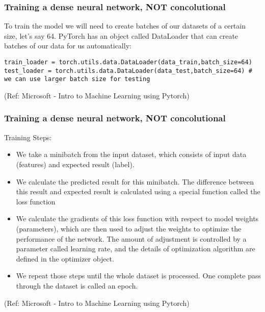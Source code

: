 \begin{frame}[fragile] \frametitle{Training a dense neural network, NOT concolutional}


To train the model we will need to create batches of our datasets of a certain size, let's say 64. PyTorch has an object called DataLoader that can create batches of our data for us automatically:

\begin{lstlisting}
train_loader = torch.utils.data.DataLoader(data_train,batch_size=64)
test_loader = torch.utils.data.DataLoader(data_test,batch_size=64) # we can use larger batch size for testing
\end{lstlisting}



\tiny{(Ref: Microsoft - Intro to Machine Learning using Pytorch)}
\end{frame}

\begin{frame}[fragile] \frametitle{Training a dense neural network, NOT concolutional}

Training Steps:

\begin{itemize}
\item We take a minibatch from the input dataset, which consists of input data (features) and expected result (label).
\item We calculate the predicted result for this minibatch.
The difference between this result and expected result is calculated using a special function called the loss function
\item We calculate the gradients of this loss function with respect to model weights (parameters), which are then used to adjust the weights to optimize the performance of the network. The amount of adjustment is controlled by a parameter called learning rate, and the details of optimization algorithm are defined in the optimizer object.
\item We repeat those steps until the whole dataset is processed. One complete pass through the dataset is called an epoch.
\end{itemize}


\tiny{(Ref: Microsoft - Intro to Machine Learning using Pytorch)}
\end{frame}


